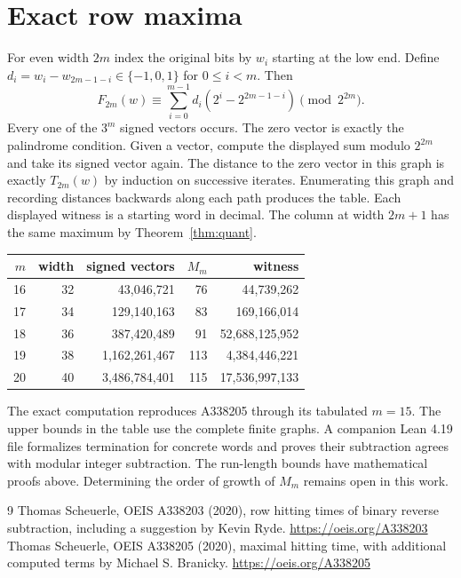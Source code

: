 \documentclass[11pt]{article}
\begin{document}
\section{Exact row maxima}
For even width $2m$ index the original bits by $w_i$ starting at the low end. Define $d_i=w_i-w_{2m-1-i}\in\{-1,0,1\}$ for $0\le i<m$. Then
\[
 F_{2m}(w)\equiv\sum_{i=0}^{m-1}d_i(2^i-2^{2m-1-i})\pmod{2^{2m}}.
\]
Every one of the $3^m$ signed vectors occurs. The zero vector is exactly the palindrome condition. Given a vector, compute the displayed sum modulo $2^{2m}$ and take its signed vector again. The distance to the zero vector in this graph is exactly $T_{2m}(w)$ by induction on successive iterates. Enumerating this graph and recording distances backwards along each path produces the table. Each displayed witness is a starting word in decimal. The column at width $2m+1$ has the same maximum by Theorem~\ref{thm:quant}.
\begin{center}
\begin{tabular}{rrrrr}\toprule
$m$ & width & signed vectors & $M_m$ & witness\\\midrule
16 & 32 & 43,046,721 & 76 & 44,739,262\\
17 & 34 & 129,140,163 & 83 & 169,166,014\\
18 & 36 & 387,420,489 & 91 & 52,688,125,952\\
19 & 38 & 1,162,261,467 & 113 & 4,384,446,221\\
20 & 40 & 3,486,784,401 & 115 & 17,536,997,133\\\bottomrule
\end{tabular}
\end{center}
The exact computation reproduces A338205 through its tabulated $m=15$. The upper bounds in the table use the complete finite graphs. A companion Lean 4.19 file formalizes termination for concrete words and proves their subtraction agrees with modular integer subtraction. The run-length bounds have mathematical proofs above. Determining the order of growth of $M_m$ remains open in this work.

\begin{thebibliography}{9}
 Thomas Scheuerle, OEIS A338203 (2020), row hitting times of binary reverse subtraction, including a suggestion by Kevin Ryde. \url{https://oeis.org/A338203}
 Thomas Scheuerle, OEIS A338205 (2020), maximal hitting time, with additional computed terms by Michael S. Branicky. \url{https://oeis.org/A338205}
\end{thebibliography}
\end{document}
